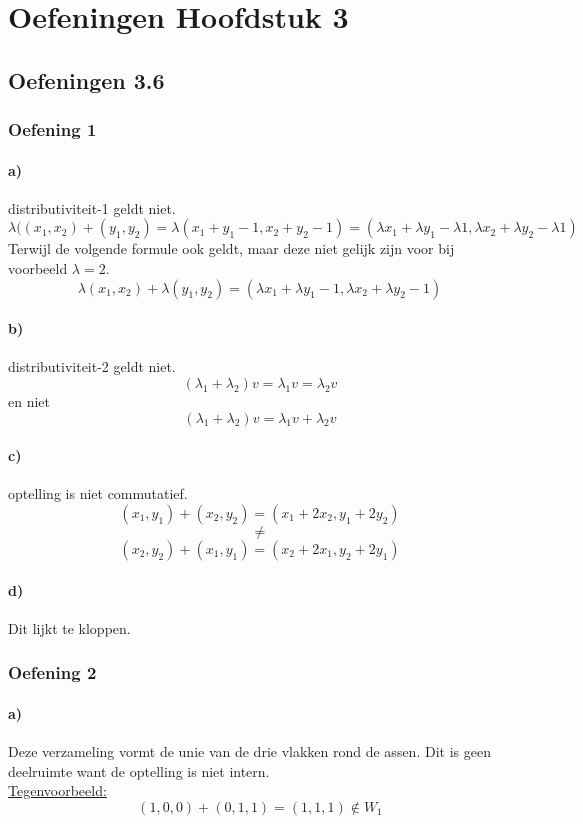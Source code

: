 \documentclass[lineaire_algebra_oplossingen.tex]{subfiles}
\begin{document}
\chapter{Oefeningen Hoofdstuk 3}
\section{Oefeningen 3.6}
\subsection{Oefening 1}
\subsubsection*{a)}
distributiviteit-1 geldt niet.
\[
\lambda((x_1,x_2) + (y_1,y_2)  = \lambda(x_1+y_1-1,x_2+y_2-1) = (\lambda x_1+\lambda y_1-\lambda 1,\lambda x_2+\lambda y_2-\lambda 1)
\]
Terwijl de volgende formule ook geldt, maar deze niet gelijk zijn voor bij voorbeeld $\lambda = 2$.
\[
\lambda(x_1,x_2) + \lambda(y_1,y_2) = (\lambda x_1+\lambda y_1- 1,\lambda x_2+\lambda y_2-1)
\]
\subsubsection*{b)}
distributiviteit-2 geldt niet.
\[
(\lambda_1 + \lambda_2)v = \lambda_1v = \lambda_2v
\]
en niet
\[
(\lambda_1 + \lambda_2)v = \lambda_1v+\lambda_2v
\]

\subsubsection*{c)}
optelling is niet commutatief.
\[
(x_1,y_1) + (x_2,y_2) = (x_1+2x_2,y_1+2y_2)
\]
\[ \neq \]
\[
(x_2,y_2) + (x_1,y_1) = (x_2+2x_1,y_2+2y_1)
\]

\subsubsection*{d)}
Dit lijkt te kloppen.

\subsection{Oefening 2}
\subsubsection*{a)}
Deze verzameling vormt de unie van de drie vlakken rond de assen. Dit is geen deelruimte want de optelling is niet intern.\\
\underline{Tegenvoorbeeld:}\\
\[
(1,0,0) + (0,1,1) = (1,1,1) \not \in W_1
\]
\end{document}
